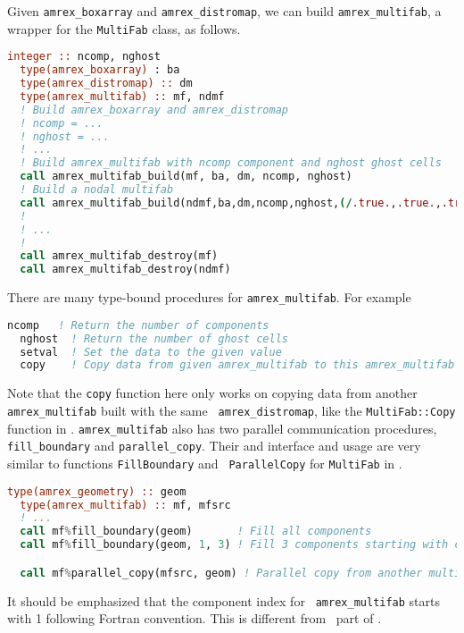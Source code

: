 {Given {\tt amrex\_boxarray} and {\tt amrex\_distromap}, we can build
{\tt amrex\_multifab}, a wrapper for the {\tt MultiFab} class, as
follows. 
\begin{lstlisting}[language=fortran]
  integer :: ncomp, nghost
  type(amrex_boxarray) : ba
  type(amrex_distromap) :: dm
  type(amrex_multifab) :: mf, ndmf
  ! Build amrex_boxarray and amrex_distromap
  ! ncomp = ...
  ! nghost = ...
  ! ...
  ! Build amrex_multifab with ncomp component and nghost ghost cells
  call amrex_multifab_build(mf, ba, dm, ncomp, nghost)
  ! Build a nodal multifab
  call amrex_multifab_build(ndmf,ba,dm,ncomp,nghost,(/.true.,.true.,.true./))
  !
  ! ...
  !
  call amrex_multifab_destroy(mf)
  call amrex_multifab_destroy(ndmf)
\end{lstlisting}
There are many type-bound procedures for {\tt amrex\_multifab}.  For
example
\begin{lstlisting}[language=fortran]
  ncomp   ! Return the number of components
  nghost  ! Return the number of ghost cells
  setval  ! Set the data to the given value 
  copy    ! Copy data from given amrex_multifab to this amrex_multifab
\end{lstlisting}
Note that the {\tt copy} function here only works on copying data from
another {\tt amrex\_multifab} built with the same {\tt
  amrex\_distromap}, like the {\tt MultiFab::Copy} function in \cpp.
{\tt amrex\_multifab} also has two parallel communication procedures,
{\tt fill\_boundary} and {\tt parallel\_copy}.  Their and interface
and usage are very similar to functions {\tt FillBoundary} and {\tt
  ParallelCopy} for {\tt MultiFab} in \cpp.
\begin{lstlisting}[language=fortran]
  type(amrex_geometry) :: geom
  type(amrex_multifab) :: mf, mfsrc
  ! ...
  call mf%fill_boundary(geom)       ! Fill all components
  call mf%fill_boundary(geom, 1, 3) ! Fill 3 components starting with component 1

  call mf%parallel_copy(mfsrc, geom) ! Parallel copy from another multifab
\end{lstlisting}
It should be emphasized that the component index for {\tt
  amrex\_multifab} starts with 1 following Fortran convention.  This
is different from \cpp\ part of \amrex.

}
